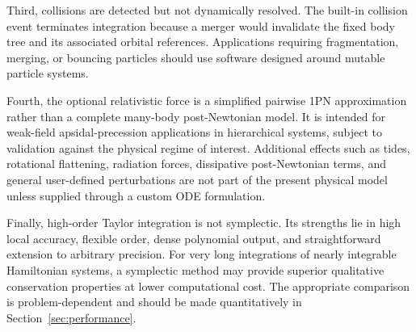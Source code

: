 \documentclass[11pt]{article}
\begin{document}
Third, collisions are detected but not dynamically resolved. The built-in
collision event terminates integration because a merger would invalidate the
fixed body tree and its associated orbital references. Applications requiring
fragmentation, merging, or bouncing particles should use software designed
around mutable particle systems.

Fourth, the optional relativistic force is a simplified pairwise 1PN
approximation rather than a complete many-body post-Newtonian model. It is
intended for weak-field apsidal-precession applications in hierarchical
systems, subject to validation against the physical regime of interest.
Additional effects such as tides, rotational flattening, radiation forces,
dissipative post-Newtonian terms, and general user-defined perturbations are
not part of the present physical model unless supplied through a custom ODE
formulation.

Finally, high-order Taylor integration is not symplectic. Its strengths lie
in high local accuracy, flexible order, dense polynomial output, and
straightforward extension to arbitrary precision. For very long integrations
of nearly integrable Hamiltonian systems, a symplectic method may provide
superior qualitative conservation properties at lower computational cost.
The appropriate comparison is problem-dependent and should be made
quantitatively in Section~\ref{sec:performance}.
\end{document}
